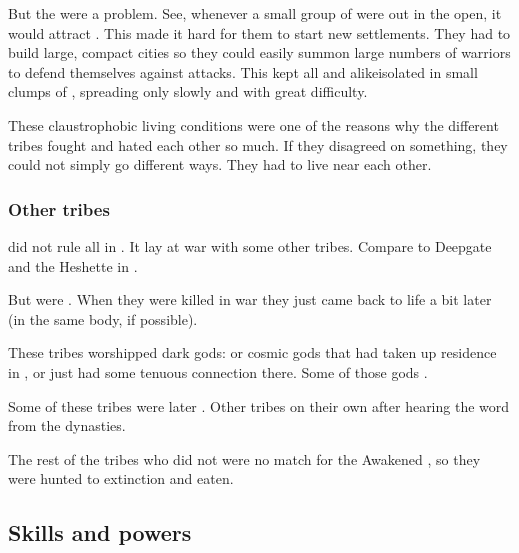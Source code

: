 But the \umbrae{} were a problem. 
See, whenever a small group of \resphain{} were out in the open, it would attract \umbrae.
This made it hard for them to start new settlements. 
They had to build large, compact cities so they could easily summon large numbers of \resphan{} warriors to defend themselves against \umbra{} attacks. 
This kept all \resphain\dash \Merkyrans{} and  alike\dash isolated in small clumps of \Nyx, spreading only slowly and with great difficulty. 

These claustrophobic living conditions were one of the reasons why the different \resphan{} tribes fought and hated each other so much. 
If they disagreed on something, they could not simply go different ways. 
They had to live near each other. 





\subsubsection{Other \resphan{} tribes}
\Merkyrah{} did not rule all \resphain{} in \Nyx. 
It lay at war with some other tribes. 
Compare to Deepgate and the Heshette in . 

But \resphain{} were . 
When they were killed in war they just came back to life a bit later (in the same body, if possible). 

These tribes worshipped dark gods: 
\XzaiShanns{} or cosmic gods that had taken up residence in \Nyx{}, or just had some tenuous connection there. 
Some of those gods . 

Some of these tribes were later . 
Other tribes  on their own after hearing the word from the dynasties. 

The rest of the tribes who did not  were no match for the Awakened \resphain{}, so they were hunted to extinction and eaten. 









\subsection{Skills and powers}





